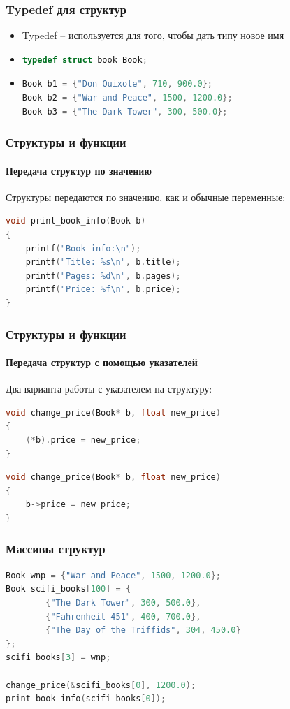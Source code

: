 \documentclass[12pt,pdf,hyperref={unicode}]{beamer}
\begin{document}
\begin{frame}[fragile]
\frametitle{Typedef для структур} 
\begin{itemize}
\item Typedef -- используется для того, чтобы дать типу новое имя \\
\item 
\begin{lstlisting}[language=C++,basicstyle=\ttfamily,keywordstyle=\color{blue}]
typedef struct book Book;
\end{lstlisting}
\item 
\begin{lstlisting}[language=C++,basicstyle=\ttfamily,keywordstyle=\color{blue}]
Book b1 = {"Don Quixote", 710, 900.0};
Book b2 = {"War and Peace", 1500, 1200.0};
Book b3 = {"The Dark Tower", 300, 500.0};
\end{lstlisting}
\end{itemize}
\end{frame}




\begin{frame}[fragile]
\frametitle{Структуры и функции} 
\framesubtitle{Передача структур по значению} 
Структуры передаются по значению, как и обычные переменные:
\begin{lstlisting}[language=C++,basicstyle=\ttfamily,keywordstyle=\color{blue}]
void print_book_info(Book b)
{
    printf("Book info:\n");
    printf("Title: %s\n", b.title);
    printf("Pages: %d\n", b.pages);
    printf("Price: %f\n", b.price);
}
\end{lstlisting}
\end{frame}


\begin{frame}[fragile]
\frametitle{Структуры и функции} 
\framesubtitle{Передача структур с помощью указателей} 
Два варианта работы с указателем на структуру: \\
\begin{lstlisting}[language=C++,basicstyle=\ttfamily,keywordstyle=\color{blue}]
void change_price(Book* b, float new_price)
{
    (*b).price = new_price;
}
\end{lstlisting}
\begin{lstlisting}[language=C++,basicstyle=\ttfamily,keywordstyle=\color{blue}]
void change_price(Book* b, float new_price)
{
    b->price = new_price;
}
\end{lstlisting}
\end{frame}

\begin{frame}[fragile]
\frametitle{Массивы структур} 
\begin{lstlisting}[language=C++,basicstyle=\ttfamily,keywordstyle=\color{blue}]
Book wnp = {"War and Peace", 1500, 1200.0};
Book scifi_books[100] = {
        {"The Dark Tower", 300, 500.0}, 
        {"Fahrenheit 451", 400, 700.0},
        {"The Day of the Triffids", 304, 450.0}
};
scifi_books[3] = wnp;

change_price(&scifi_books[0], 1200.0);
print_book_info(scifi_books[0]);

\end{lstlisting}
\end{frame}
\end{document}
